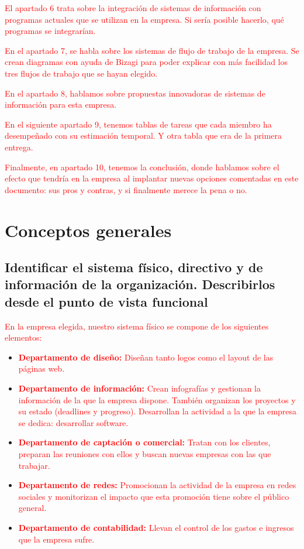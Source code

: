 \documentclass{article}
\begin{document}
\textcolor{Red}{El apartado 6 trata sobre la integración de sistemas de información con programas actuales que se utilizan en la empresa. Si sería posible hacerlo, qué programas se integrarían.}  

\textcolor{Red}{En el apartado 7, se habla sobre los sistemas de flujo de trabajo de la empresa. Se crean diagramas con ayuda de Bizagi para poder explicar con más facilidad los tres flujos de trabajo que se hayan elegido.}

\textcolor{Red}{En el apartado 8, hablamos sobre propuestas innovadoras de sistemas de información para esta empresa.}

\textcolor{Red}{En el siguiente apartado 9, tenemos tablas de tareas que cada miembro ha desempeñado con su estimación temporal. Y otra tabla que era de la primera entrega.}

\textcolor{Red}{Finalmente, en apartado 10, tenemos la conclusión, donde hablamos sobre el efecto que tendría en la empresa al implantar nuevas opciones comentadas en este documento: sus pros y contras, y si finalmente merece la pena o no.} 

\section{Conceptos generales}

\subsection{Identificar el sistema físico, directivo y de información de la organización. Describirlos desde el punto de vista funcional}

\textcolor{Red}{En la empresa elegida, nuestro sistema físico se compone de los siguientes elementos:}

\begin{itemize}
\item \textcolor{Red}{\textbf{Departamento de diseño:} Diseñan tanto logos como el layout de las páginas web.}
\item \textcolor{Red}{\textbf{Departamento de información:}  Crean infografías y gestionan la información de la que la empresa dispone. También organizan los proyectos y su estado (deadlines y progreso). Desarrollan la actividad a la que la empresa se dedica: desarrollar software.}
\item \textcolor{Red}{\textbf{Departamento de captación o comercial:} Tratan con los clientes, preparan las reuniones con ellos y buscan nuevas empresas con las que trabajar.}
\item \textcolor{Red}{\textbf{Departamento de redes:} Promocionan la actividad de la empresa en redes sociales y monitorizan el impacto que esta promoción tiene sobre el público general.}
\item \textcolor{Red}{\textbf{Departamento de contabilidad:} Llevan el control de los gastos e ingresos que la empresa sufre.}
\end{itemize}
\end{document}
